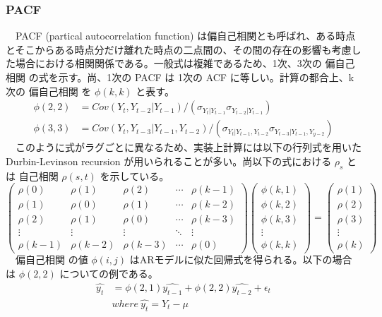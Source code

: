 \documentclass[dvipdfmx]{scrartcl}
\begin{document}
\subsubsection{PACF}
\label{sec:org0125c4e}
　PACF (partical autocorrelation function) は偏自己相関とも呼ばれ、ある時点とそこからある時点分だけ離れた時点の二点間の、その間の存在の影響も考慮した場合における相関関係である。一般式は複雑であるため、1次、3次の 偏自己相関 の式を示す。尚、1次の PACF は 1次の ACF に等しい。計算の都合上、k次の 偏自己相関 を \(\phi(k, k)\) と表す。\\
\begin{align}
\phi(2, 2) &= Cov(Y_t,Y_{t-2}|Y_{t-1}) / (\sigma_{Y_t|Y_{t-1}} \sigma_{Y_{t-2}|Y_{t-1}}) \\
\phi(3, 3) &= Cov(Y_t,Y_{t-3}|Y_{t-1},Y_{t-2})/(\sigma_{Y_t|Y_{t-1},Y_{t-2}}\sigma_{Y_{t-3}|Y_{t-1},Y_{y-2}})
\end{align}
　このように式がラグごとに異なるため、実装上計算には以下の行列式を用いた Durbin-Levinson recursion が用いられることが多い。尚以下の式における \(\rho_s\) とは 自己相関 \(\rho(s, t)\) を示している。\\
\begin{equation}
\left(\begin{array}{ccccc}
\rho(0) & \rho(1) & \rho(2) & \cdots & \rho(k-1) \\
\rho(1) & \rho(0) & \rho(1) & \cdots & \rho(k-2) \\
\rho(2) & \rho(1) & \rho(0) & \cdots & \rho(k-3) \\ 
\vdots  & \vdots  & \vdots  & \ddots & \vdots \\
\rho(k-1) & \rho(k-2) & \rho(k-3) & \cdots & \rho(0)
\end{array}\right)\left(
\begin{array}{c}
\phi(k, 1) \\
\phi(k, 2) \\
\phi(k, 3) \\
\vdots \\
\phi(k, k) 
\end{array}\right)=\left(\begin{array}{c}
\rho(1) \\
\rho(2) \\
\rho(3) \\
\vdots \\
\rho(k) \end{array}\right)
\end{equation}
　偏自己相関 の値 \(\phi(i, j)\) はARモデルに似た回帰式を得られる。以下の場合は \(\phi(2,2)\) についての例である。\\
\begin{align}
\hat{y_t} &= \phi(2,1) \hat{y_{t-1}} + \phi(2,2)\hat{y_{t-2}} + \epsilon_t \\
&where \ \hat{y_t} = Y_t - \mu 
\end{align}
\end{document}
